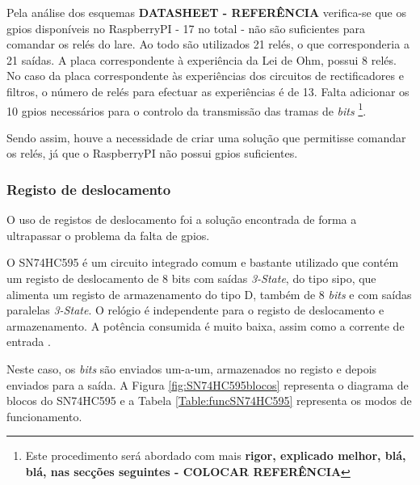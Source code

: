 Pela análise dos esquemas \textbf{DATASHEET - REFERÊNCIA} verifica-se que os \acrshort{gpio}s disponíveis no \gls{RaspberryPI} - 17 no total - não são suficientes para comandar os relés do \acrshort{lare}. Ao todo são utilizados 21 relés, o que corresponderia a 21 saídas. A placa correspondente à experiência da Lei de Ohm, possui 8 relés. No caso da placa correspondente às experiências dos circuitos de rectificadores e filtros, o número de relés para efectuar as experiências é de 13. Falta adicionar os 10 \acrshort{gpio}s necessários para o controlo da transmissão das tramas de \textit{bits} \footnote{Este procedimento será abordado com mais \textbf{rigor, explicado melhor, blá, blá, nas secções seguintes - COLOCAR REFERÊNCIA}}.

Sendo assim, houve a necessidade de criar uma solução que permitisse comandar os relés, já que o \gls{RaspberryPI} não possui \acrshort{gpio}s suficientes.

\subsubsection{Registo de deslocamento}
O uso de registos de deslocamento foi a solução encontrada de forma a ultrapassar o problema da falta de \acrshort{gpio}s. 

O SN74HC595 é um circuito integrado comum e bastante utilizado que contém um registo de deslocamento de 8 bits com saídas \textit{3-State}, do tipo \acrfull{sipo}, que alimenta um registo de armazenamento do tipo D, também de 8 \textit{bits} e com saídas paralelas \textit{3-State}. O relógio é independente para o registo de deslocamento e armazenamento. A potência consumida é muito baixa, assim como a corrente de entrada \cite{SN74HC595}.

Neste caso, os \textit{bits} são enviados um-a-um, armazenados no registo e depois enviados para a saída. A Figura \ref{fig:SN74HC595blocos} representa o diagrama de blocos do SN74HC595 e a Tabela \ref{Table:funcSN74HC595} representa os modos de funcionamento.

